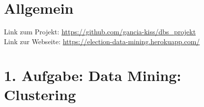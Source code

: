 \usepackage{graphicx}
\usepackage{listings} %

\newcommand{\dozent}{Prof.  Dr.  Agnès Voisard, Nicolas Lehmann}					%
\newcommand{\tutor}{Hoffman Christian}						%
\newcommand{\tutoriumNo}{ 3, Gruppe 22}				%
\newcommand{\projectNo}{3. Iteration}									%
\newcommand{\veranstaltung}{Datenbank Systeme}	%
\newcommand{\semester}{SoeSe 2017}						%
\newcommand{\studenten}{Ingrid Tchilibou, Emil Milanov, Boyan Hristov}			%






\section*{Allgemein}
Link zum Projekt: \url{https://github.com/gancia-kiss/dbs_projekt} \\
Link zur Webseite: \url{https://election-data-mining.herokuapp.com/}


\section*{1. Aufgabe: Data Mining: Clustering}


